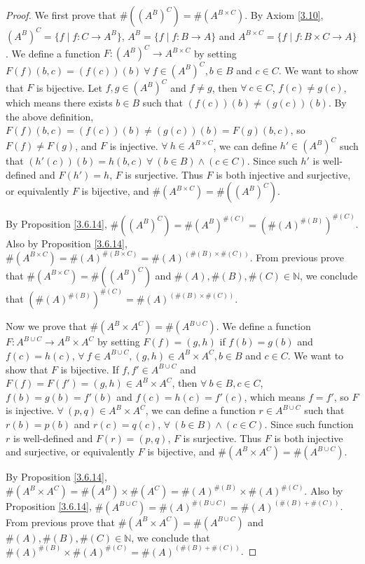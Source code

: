 \begin{proof}
We first prove that \(\#((A^B)^C) = \#(A^{B \times C})\).
By Axiom \ref{3.10}, \((A^B)^C = \{f \mid f : C \to A^B\}\), \(A^B = \{f \mid f : B \to A\}\) and \(A^{B \times C} = \{f \mid f : B \times C \to A\}\).
We define a function \(F : (A^B)^C \to A^{B \times C}\) by setting \(F(f)(b, c) = (f(c))(b) \ \forall\ f \in (A^B)^C, b \in B\) and \(c \in C\).
We want to show that \(F\) is bijective.
Let \(f, g \in (A^B)^C\) and \(f \neq g\), then \(\forall\ c \in C\), \(f(c) \neq g(c)\), which means there exists \(b \in B\) such that \((f(c))(b) \neq (g(c))(b)\).
By the above definition, \(F(f)(b, c) = (f(c))(b) \neq (g(c))(b) = F(g)(b, c)\), so \(F(f) \neq F(g)\), and \(F\) is injective.
\(\forall\ h \in A^{B \times C}\), we can define \(h' \in (A^B)^C\) such that \((h'(c))(b) = h(b, c) \ \forall\ (b \in B) \land (c \in C)\).
Since such \(h'\) is well-defined and \(F(h') = h\), \(F\) is surjective.
Thus \(F\) is both injective and surjective, or equivalently \(F\) is bijective, and \(\#(A^{B \times C}) = \#((A^B)^C)\).

By Proposition \ref{3.6.14}, \(\#((A^B)^C) = \#(A^B)^{\#(C)} = (\#(A)^{\#(B)})^{\#(C)}\).
Also by Proposition \ref{3.6.14}, \(\#(A^{B \times C}) = \#(A)^{\#(B \times C)} = \#(A)^{(\#(B) \times \#(C))}\).
From previous prove that \(\#(A^{B \times C}) = \#((A^B)^C)\) and \(\#(A), \#(B), \#(C) \in \mathds{N}\), we conclude that \((\#(A)^{\#(B)})^{\#(C)} = \#(A)^{(\#(B) \times \#(C))}\).

Now we prove that \(\#(A^B \times A^C) = \#(A^{B \cup C})\).
We define a function \(F : A^{B \cup C} \to A^B \times A^C\) by setting \(F(f) = (g, h)\) if \(f(b) = g(b)\) and \(f(c) = h(c)\), \(\forall\ f \in A^{B \cup C}, (g, h) \in A^B \times A^C, b \in B\) and \(c \in C\).
We want to show that \(F\) is bijective.
If \(f, f' \in A^{B \cup C}\) and \(F(f) = F(f') = (g, h) \in A^B \times A^C\), then \(\forall\ b \in B, c \in C\), \(f(b) = g(b) = f'(b)\) and \(f(c) = h(c) = f'(c)\), which means \(f = f'\), so \(F\) is injective.
\(\forall\ (p, q) \in A^B \times A^C\), we can define a function \(r \in A^{B \cup C}\) such that \(r(b) = p(b)\) and \(r(c) = q(c)\), \(\forall\ (b \in B) \land (c \in C)\).
Since such function \(r\) is well-defined and \(F(r) = (p, q)\), \(F\) is surjective.
Thus \(F\) is both injective and surjective, or equivalently \(F\) is bijective, and \(\#(A^B \times A^C) = \#(A^{B \cup C})\).

By Proposition \ref{3.6.14}, \(\#(A^B \times A^C) = \#(A^B) \times \#(A^C) = \#(A)^{\#(B)} \times \#(A)^{\#(C)}\).
Also by Proposition \ref{3.6.14}, \(\#(A^{B \cup C}) = \#(A)^{\#(B \cup C)} = \#(A)^{(\#(B) + \#(C))}\).
From previous prove that \(\#(A^B \times A^C) = \#(A^{B \cup C})\) and \(\#(A), \#(B), \#(C) \in \mathds{N}\), we conclude that \(\#(A)^{\#(B)} \times \#(A)^{\#(C)} = \#(A)^{(\#(B) + \#(C))}\).
\end{proof}

